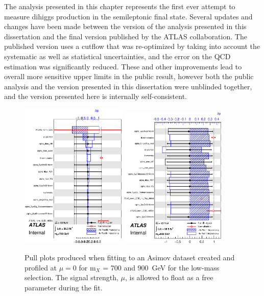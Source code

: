 The analysis presented in this chapter represents the first ever attempt to measure dihiggs production in the semileptonic \bbWW final state. Several updates and changes have been made between the version of the analysis presented in this dissertation and the final version published by the ATLAS collaboration. The published version uses a cutflow that was re-optimized by taking into account the systematic as well as statistical uncertainties, and the error on the QCD estimation was significantly reduced. These and other improvements lead to overall more sensitive upper limits in the public result, however both the public analysis and the version presented in this dissertation were unblinded together, and the version presented here is internally self-consistent.
\begin{figure}[hb]
\begin{center}
  \includegraphics[width=0.45\textwidth]{chapters/dihiggs2/figures/statFit/pullPlot_X700_mu0_unconditional.eps} 
  \includegraphics[width=0.45\textwidth]{chapters/dihiggs2/figures/statFit/pullPlot_X900_mu0_unconditional.eps}
   \caption{Pull plots produced when fitting to an Asimov dataset created and profiled at $\mu=0$ for m$_X$ = 700 and 900~GeV for the low-mass selection. The signal strength, $\mu$, is allowed to float as a free parameter during the fit.}
  \label{fig:pullPlots1_mu_uncond}
\end{center}    
\end{figure}
